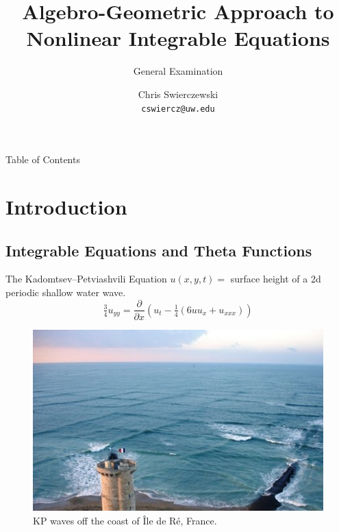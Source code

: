 \documentclass {beamer}
\title{Algebro-Geometric Approach to Nonlinear Integrable Equations}
\subtitle{General Examination}
\author{
  Chris Swierczewski\\
  {\tt cswiercz@uw.edu}
}
\institute{
  Department of Applied Mathematics\\
  University of Washington\\
  Seattle, Washington
}
\begin{document}

\begin{frame}
  \titlepage
\end{frame}

\begin{frame}{Table of Contents}{}
  \tableofcontents
\end{frame}

\section{Introduction}

\subsection{Integrable Equations and Theta Functions}

\begin{frame}{The Kadomtsev--Petviashvili Equation}{}
  \vspace{10pt}
  $u(x,y,t) = $ surface height of a 2d periodic shallow water wave.
  \[
  \tfrac{3}{4} u_{yy} = \frac{\partial}{\partial x} \left(
  u_t - \tfrac{1}{4} \left(6uu_x + u_{xxx}\right) \right)
  \]

  \begin{figure}
    \centering
    \includegraphics[height=0.4\textheight]{images/livekp.jpg}
    \caption{KP waves off the coast of \^{I}le de R\'{e}, France.}
  \end{figure}
\end{frame}
\end{document}
